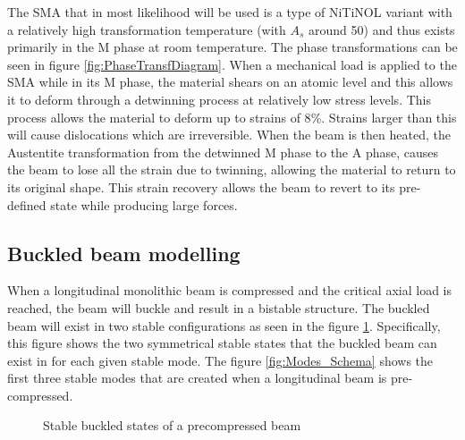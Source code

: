 The SMA that in most likelihood will be used is a type of NiTiNOL variant with a relatively high transformation temperature (with $A_s$ around 50\degreeC) and thus exists primarily in the M phase at room temperature. The phase transformations can be seen in figure \ref{fig:PhaseTransfDiagram}. When a mechanical load is applied to the SMA while in its M phase, the material shears on an atomic level and this allows it to deform through a detwinning process at relatively low stress levels. This process allows the material to deform up to strains of 8$\%$. Strains larger than this will cause dislocations which are irreversible. When the beam is then heated, the Austentite transformation from the detwinned M phase to the A phase, causes the beam to lose all the strain due to twinning, allowing the material to return to its original shape. This strain recovery allows the beam to revert to its pre-defined state while producing large forces.
\subsection{Buckled beam modelling}
When a longitudinal monolithic beam is compressed and the critical axial load is reached, the beam will buckle and result in a bistable structure. The buckled beam will exist in two stable configurations as seen in the figure \ref{fig:States_Schema}. Specifically, this figure shows the two symmetrical stable states that the buckled beam can exist in for each given stable mode. The figure \ref{fig:Modes_Schema} shows the first three stable modes that are created when a longitudinal beam is pre-compressed.

\begin{figure}[H]
	\centering
  {\tiny
	\def\svgwidth{0.4\textwidth}
	
  }
	\caption{Stable buckled states of a precompressed beam}
	\label{fig:States_Schema}
\end{figure}

